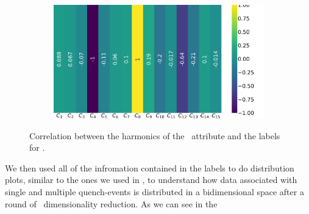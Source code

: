 \begin{figure}[!h]
\begin{subfigure}{0.49\linewidth}
	\end{subfigure}
	\begin{subfigure}{0.49\linewidth}
		\includegraphics[width=\linewidth]{img/qlp_corr/An_coil3.png}
	\end{subfigure}
	\caption{Correlation between the harmonics of the \an\ attribute and the labels for \qlp.}
	\label{fig:an-lcorr-qlp}
\end{figure}

We then used all of the infromation contained in the labels to do distribution plots, similar to the
ones we used in , to understand how data associated with single and multiple
quench-events is distributed in a bidimensional space after a round of \pca\ dimensionality
reduction. As we can see in  the

